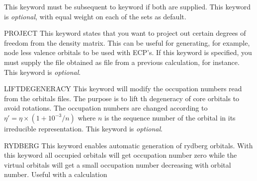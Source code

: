 \begin{keywordlist}
This keyword must be subsequent to keyword 
if both are supplied.
This keyword is {\it optional},
with equal weight on each of the sets as default.
\item[PROJECT]
This keyword states that you want to project out certain
degrees of freedom from the density matrix.
This can be useful for generating, for example,
node less valence orbitals to be used with ECP's.
If this keyword is specified, you must supply the file
 obtained as file  from a previous
 calculation, for instance.
This keyword is {\it optional}.
\item[LIFTDEGENERACY]
This keyword will modify the occupation numbers read from
the orbitals files. The purpose is to lift th
degeneracy of core orbitals to avoid rotations.
The occupation numbers are changed according to
$\eta'=\eta\times(1+10^{-3}/n)$
where $n$ is the sequence number of the orbital
in its irreducible representation.
This keyword is {\it optional}.
\item[RYDBERG]
This keyword enables automatic generation of rydberg
orbitals. With this keyword all occupied orbitals
will get occupation number zero while the virtual
orbitals will get a small occupation number
decreasing with orbital number. Useful with a calculation

\end{keywordlist}
